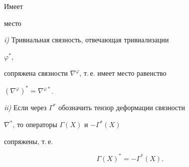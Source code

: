 Имеет 


место 


 


\begin{lems} {\em i)} Тривиальная связность, отвечающая тривиализации 


$\varphi^*$, 


сопряжена связности $\nabla^\varphi$, т.\,е. имеет место равенство 


$(\nabla^\varphi)^*=\nabla^{\varphi*}$. 


 


{\em ii)} Если через $\Gamma^*$ обозначить тензор деформации связности 


$\nabla^*$, то операторы $\Gamma(X)$ и $-\Gamma^*(X)$ 


сопряжены, т.\,е.


\begin{equation} 


\Gamma(X)^*=-\Gamma^*(X). 


\end{equation} 


\end{lems} 


 



